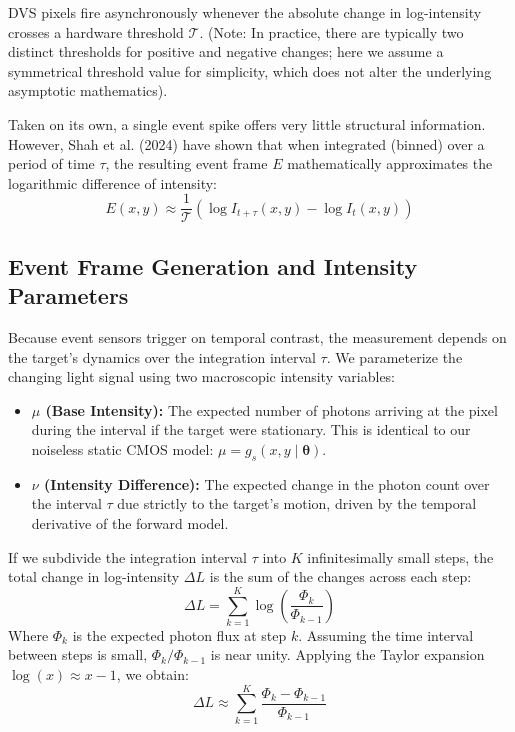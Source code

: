 \documentclass[11pt]{article}
\begin{document}
DVS pixels fire asynchronously whenever the absolute change in log-intensity crosses a hardware threshold $\mathcal{T}$. (Note: In practice, there are typically two distinct thresholds for positive and negative changes; here we assume a symmetrical threshold value for simplicity, which does not alter the underlying asymptotic mathematics).

Taken on its own, a single event spike offers very little structural information. However, Shah et al. (2024) have shown that when integrated (binned) over a period of time $\tau$, the resulting event frame $E$ mathematically approximates the logarithmic difference of intensity:
\begin{equation}
E(x,y) \approx \frac{1}{\mathcal{T}} \left( \log I_{t+\tau}(x,y) - \log I_t(x,y) \right)
\end{equation}

\subsection{Event Frame Generation and Intensity Parameters}
Because event sensors trigger on temporal contrast, the measurement depends on the target's dynamics over the integration interval $\tau$. We parameterize the changing light signal using two macroscopic intensity variables:
\begin{itemize}
    \item \textbf{$\mu$ (Base Intensity):} The expected number of photons arriving at the pixel during the interval if the target were stationary. This is identical to our noiseless static CMOS model: $\mu = g_s(x,y \mid \bm{\theta})$.
    \item \textbf{$\nu$ (Intensity Difference):} The expected change in the photon count over the interval $\tau$ due strictly to the target's motion, driven by the temporal derivative of the forward model.
\end{itemize}

If we subdivide the integration interval $\tau$ into $K$ infinitesimally small steps, the total change in log-intensity $\Delta L$ is the sum of the changes across each step:
\begin{equation}
\Delta L = \sum_{k=1}^{K} \log \left( \frac{\Phi_{k}}{\Phi_{k-1}} \right)
\end{equation}
Where $\Phi_k$ is the expected photon flux at step $k$. Assuming the time interval between steps is small, $\Phi_k / \Phi_{k-1}$ is near unity. Applying the Taylor expansion $\log(x) \approx x - 1$, we obtain:
\begin{equation}
\Delta L \approx \sum_{k=1}^{K} \frac{\Phi_k - \Phi_{k-1}}{\Phi_{k-1}}
\end{equation}
\end{document}
